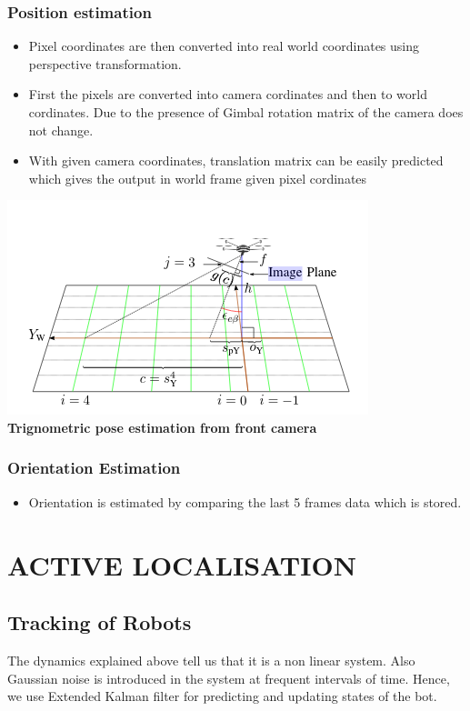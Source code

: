 \documentclass[12pt]{article}
\begin{document}
		\subsubsection{Position estimation}        
			\begin{itemize}            
				\item Pixel coordinates are then converted into real world coordinates using perspective transformation.             
				\item  First the pixels are converted into camera cordinates and then to world cordinates. Due to the presence of Gimbal rotation matrix of the camera does not change. 
				\item With given camera coordinates, translation matrix can be easily predicted which gives the output in world frame given pixel cordinates

			\end{itemize}     
			\begin{center}\includegraphics[scale=0.44]{trig} \\
    \textbf{Trignometric pose estimation from front camera}\end{center} 
		\subsubsection{Orientation  Estimation}            
			\begin{itemize}       
				\item Orientation is estimated by comparing the last 5 frames data 		which is stored.                         
			\end{itemize}
			
\section{ACTIVE LOCALISATION}
	\subsection{Tracking of Robots}
The dynamics explained above tell us that it is a non linear system. Also Gaussian noise is introduced in the system at frequent intervals of time. Hence, we use Extended Kalman filter for predicting and updating states of the bot.
\end{document}
